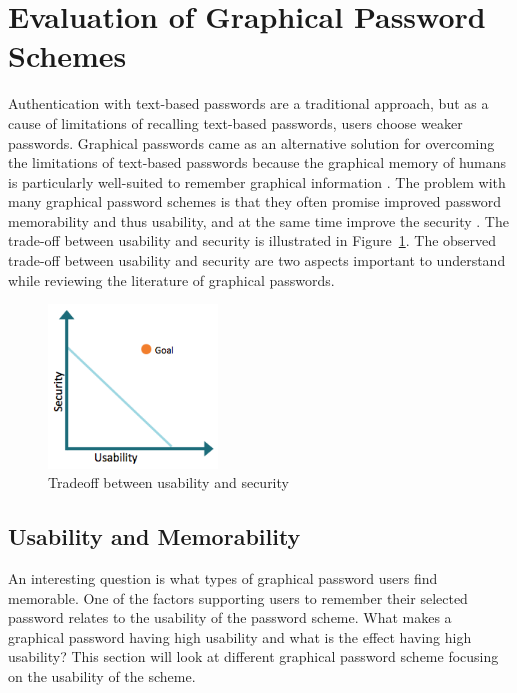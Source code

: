 \section{Evaluation of Graphical Password Schemes} \label{sec:evaluation}
	
  Authentication with text-based passwords are a traditional approach, but as a cause of limitations of recalling text-based passwords, users choose weaker passwords. Graphical passwords came as an alternative solution for overcoming the limitations of text-based passwords because the graphical memory of humans is particularly well-suited to remember graphical information \cite{DeAngeli}. The problem with many graphical password schemes is that they often promise improved password memorability and thus usability, and at the same time improve the security \cite{Biddle}. The trade-off between usability and security is illustrated in Figure~\ref{fig:usabilitysecurity}. The observed trade-off between usability and security are two aspects important to understand while reviewing the literature of graphical passwords.

  	\begin{figure}[H]
  		\centering
  		\includegraphics[width=0.40\textwidth]{pics/review/tradeoff.png}
  		\caption{Tradeoff between usability and security}
  		\label{fig:usabilitysecurity}
  	\end{figure}

  \subsection{Usability and Memorability} \label{sec:usability}

    An interesting question is what types of graphical password users find memorable. One of the factors supporting users to remember their selected password relates to the usability of the password scheme. What makes a graphical password having high usability and what is the effect having high usability? This section will look at different graphical password scheme focusing on the usability of the scheme. 

